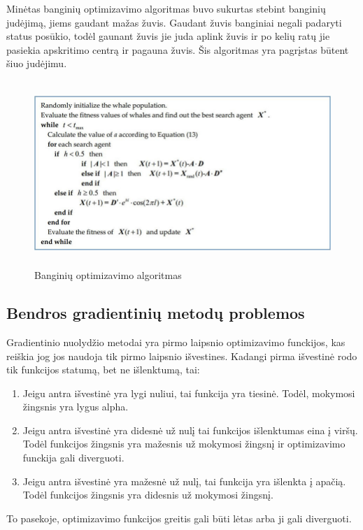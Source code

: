\documentclass{VUMIFInfKursinis}
\begin{document}
\par
Minėtas banginių optimizavimo algoritmas buvo sukurtas stebint banginių judėjimą, jiems gaudant mažas žuvis. Gaudant žuvis banginiai negali
padaryti status posūkio, todėl gaunant žuvis jie juda aplink žuvis ir po kelių ratų jie pasiekia apskritimo
centrą ir pagauna žuvis. Šis algoritmas yra pagrįstas būtent šiuo judėjimu.
\begin{figure}[ht]
  \includegraphics[width=12cm,height=7cm,keepaspectratio]{what_alg.png}
  \caption{Banginių optimizavimo algoritmas}
  \label{fig:lygtis1}
\end{figure}







\subsection{Bendros gradientinių metodų problemos}
\par
Gradientinio nuolydžio metodai yra pirmo laipsnio optimizavimo funckijos, kas
reiškia jog jos naudoja tik pirmo laipsnio išvestines. Kadangi pirma išvestinė rodo
tik funkcijos statumą, bet ne išlenktumą, tai:
\begin{enumerate}
\item Jeigu antra išvestinė yra lygi nuliui, tai funkcija yra tiesinė. Todėl,
mokymosi žingsnis yra lygus alpha.
\item Jeigu antra išvestinė yra didesnė už nulį tai funkcijos išlenktumas eina į viršų.
Todėl funkcijos žingsnis yra mažesnis už mokymosi žingsnį ir optimizavimo funckija gali
diverguoti.
\item Jeigu antra išvestinė yra mažesnė už nulį, tai funkcija yra išlenkta į apačią.
Todėl funkcijos žingsnis yra didesnis už mokymosi žingsnį.
\end{enumerate}
\par
To pasekoje, optimizavimo funkcijos greitis gali būti lėtas arba ji gali diverguoti.
\end{document}
